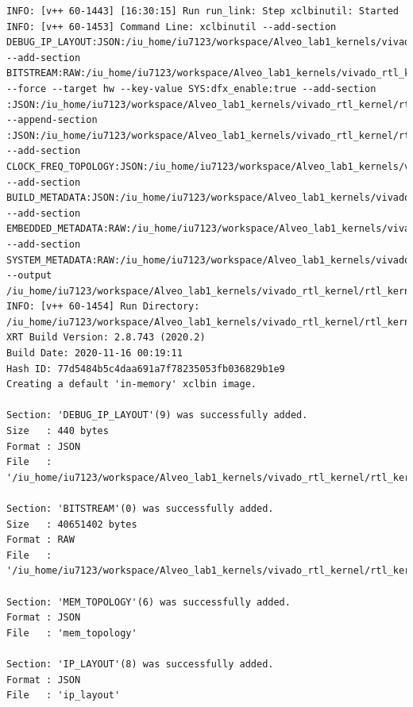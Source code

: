 \begin{lstlisting}
INFO: [v++ 60-1443] [16:30:15] Run run_link: Step xclbinutil: Started
INFO: [v++ 60-1453] Command Line: xclbinutil --add-section DEBUG_IP_LAYOUT:JSON:/iu_home/iu7123/workspace/Alveo_lab1_kernels/vivado_rtl_kernel/rtl_kernel_wizard_2_ex/exports/_x/link/int/debug_ip_layout.rtd --add-section BITSTREAM:RAW:/iu_home/iu7123/workspace/Alveo_lab1_kernels/vivado_rtl_kernel/rtl_kernel_wizard_2_ex/exports/_x/link/int/partial.bit --force --target hw --key-value SYS:dfx_enable:true --add-section :JSON:/iu_home/iu7123/workspace/Alveo_lab1_kernels/vivado_rtl_kernel/rtl_kernel_wizard_2_ex/exports/_x/link/int/vinc.rtd --append-section :JSON:/iu_home/iu7123/workspace/Alveo_lab1_kernels/vivado_rtl_kernel/rtl_kernel_wizard_2_ex/exports/_x/link/int/appendSection.rtd --add-section CLOCK_FREQ_TOPOLOGY:JSON:/iu_home/iu7123/workspace/Alveo_lab1_kernels/vivado_rtl_kernel/rtl_kernel_wizard_2_ex/exports/_x/link/int/vinc_xml.rtd --add-section BUILD_METADATA:JSON:/iu_home/iu7123/workspace/Alveo_lab1_kernels/vivado_rtl_kernel/rtl_kernel_wizard_2_ex/exports/_x/link/int/vinc_build.rtd --add-section EMBEDDED_METADATA:RAW:/iu_home/iu7123/workspace/Alveo_lab1_kernels/vivado_rtl_kernel/rtl_kernel_wizard_2_ex/exports/_x/link/int/vinc.xml --add-section SYSTEM_METADATA:RAW:/iu_home/iu7123/workspace/Alveo_lab1_kernels/vivado_rtl_kernel/rtl_kernel_wizard_2_ex/exports/_x/link/int/systemDiagramModelSlrBaseAddress.json --output /iu_home/iu7123/workspace/Alveo_lab1_kernels/vivado_rtl_kernel/rtl_kernel_wizard_2_ex/exports/vinc.xclbin
INFO: [v++ 60-1454] Run Directory: /iu_home/iu7123/workspace/Alveo_lab1_kernels/vivado_rtl_kernel/rtl_kernel_wizard_2_ex/exports/_x/link/run_link
XRT Build Version: 2.8.743 (2020.2)
Build Date: 2020-11-16 00:19:11
Hash ID: 77d5484b5c4daa691a7f78235053fb036829b1e9
Creating a default 'in-memory' xclbin image.

Section: 'DEBUG_IP_LAYOUT'(9) was successfully added.
Size   : 440 bytes
Format : JSON
File   : '/iu_home/iu7123/workspace/Alveo_lab1_kernels/vivado_rtl_kernel/rtl_kernel_wizard_2_ex/exports/_x/link/int/debug_ip_layout.rtd'

Section: 'BITSTREAM'(0) was successfully added.
Size   : 40651402 bytes
Format : RAW
File   : '/iu_home/iu7123/workspace/Alveo_lab1_kernels/vivado_rtl_kernel/rtl_kernel_wizard_2_ex/exports/_x/link/int/partial.bit'

Section: 'MEM_TOPOLOGY'(6) was successfully added.
Format : JSON
File   : 'mem_topology'

Section: 'IP_LAYOUT'(8) was successfully added.
Format : JSON
File   : 'ip_layout'


\end{lstlisting}
